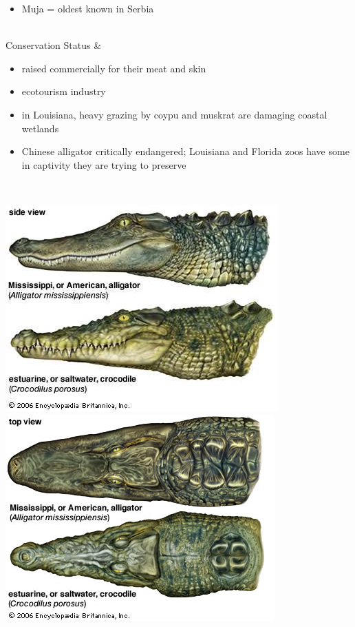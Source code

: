 \begin{center}
\begin{longtabu}
\begin{itemize}[noitemsep]
		\item Muja = oldest known in Serbia
	\end{itemize}
	\\
	\hline
	Conservation Status & 
	\begin{itemize}[noitemsep]
		\item raised commercially for their meat and skin
		\item ecotourism industry
		\item in Louisiana, heavy grazing by coypu and muskrat are damaging coastal wetlands
		\item Chinese alligator critically endangered; Louisiana and Florida zoos have some in captivity they are trying to preserve
	\end{itemize}
	\\
	\hline
\end{longtabu}
\includegraphics[scale=0.5]{crocodylia/alligatoridae/side.jpg}
\includegraphics[scale=0.5]{crocodylia/alligatoridae/top.jpg}

\end{center}
